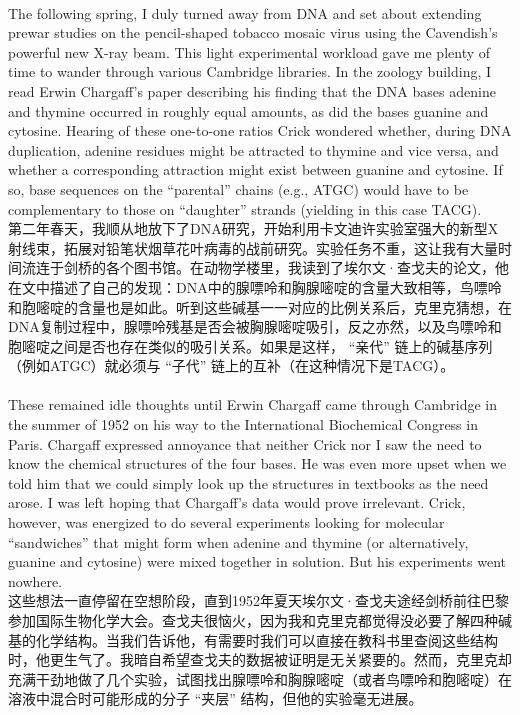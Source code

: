 \documentclass{article}
\begin{document}
\\
The following spring, I duly turned away from DNA and set about extending prewar studies on the pencil-shaped tobacco mosaic virus using the Cavendish’s powerful new X-ray beam. This light experimental workload gave me plenty of time to wander through various Cambridge libraries. In the zoology building, I read Erwin Chargaff’s paper describing his finding that the DNA bases adenine and thymine occurred in roughly equal amounts, as did the bases guanine and cytosine. Hearing of these one-to-one ratios Crick wondered whether, during DNA duplication, adenine residues might be attracted to thymine and vice versa, and whether a corresponding attraction might exist between guanine and cytosine. If so, base sequences on the “parental” chains (e.g., ATGC) would have to be complementary to those on “daughter” strands (yielding in this case TACG). \\
第二年春天，我顺从地放下了DNA研究，开始利用卡文迪许实验室强大的新型X射线束，拓展对铅笔状烟草花叶病毒的战前研究。实验任务不重，这让我有大量时间流连于剑桥的各个图书馆。在动物学楼里，我读到了埃尔文·查戈夫的论文，他在文中描述了自己的发现：DNA中的腺嘌呤和胸腺嘧啶的含量大致相等，鸟嘌呤和胞嘧啶的含量也是如此。听到这些碱基一一对应的比例关系后，克里克猜想，在DNA复制过程中，腺嘌呤残基是否会被胸腺嘧啶吸引，反之亦然，以及鸟嘌呤和胞嘧啶之间是否也存在类似的吸引关系。如果是这样， “亲代” 链上的碱基序列（例如ATGC）就必须与 “子代” 链上的互补（在这种情况下是TACG）。\\ 

\\
These remained idle thoughts until Erwin Chargaff came through Cambridge in the summer of 1952 on his way to the International Biochemical Congress in Paris. Chargaff expressed annoyance that neither Crick nor I saw the need to know the chemical structures of the four bases. He was even more upset when we told him that we could simply look up the structures in textbooks as the need arose. I was left hoping that Chargaff’s data would prove irrelevant. Crick, however, was energized to do several experiments looking for molecular “sandwiches” that might form when adenine and thymine (or alternatively, guanine and cytosine) were mixed together in solution. But his experiments went nowhere.\\
这些想法一直停留在空想阶段，直到1952年夏天埃尔文·查戈夫途经剑桥前往巴黎参加国际生物化学大会。查戈夫很恼火，因为我和克里克都觉得没必要了解四种碱基的化学结构。当我们告诉他，有需要时我们可以直接在教科书里查阅这些结构时，他更生气了。我暗自希望查戈夫的数据被证明是无关紧要的。然而，克里克却充满干劲地做了几个实验，试图找出腺嘌呤和胸腺嘧啶（或者鸟嘌呤和胞嘧啶）在溶液中混合时可能形成的分子 “夹层” 结构，但他的实验毫无进展。 \\
\end{document}
